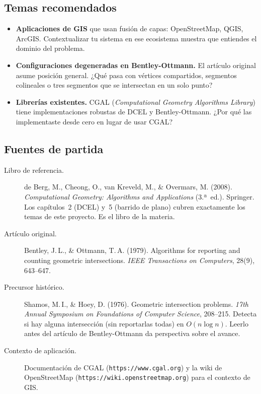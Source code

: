 \documentclass[12pt, oneside]{article}
\begin{document}
\subsection{Temas recomendados}

\begin{itemize}
  \item \textbf{Aplicaciones de GIS} que usan fusión de capas:
        OpenStreetMap, QGIS, ArcGIS.  Contextualizar tu sistema en
        ese ecosistema muestra que entiendes el dominio del problema.

  \item \textbf{Configuraciones degeneradas en Bentley-Ottmann.}
        El artículo original asume posición general.  ¿Qué pasa con
        vértices compartidos, segmentos colineales o tres segmentos
        que se intersectan en un solo punto?

  \item \textbf{Librerías existentes.}  CGAL (\textit{Computational
        Geometry Algorithms Library}) tiene implementaciones robustas
        de DCEL y Bentley-Ottmann.  ¿Por qué las implementaste desde
        cero en lugar de usar CGAL?
\end{itemize}

\subsection{Fuentes de partida}

\begin{description}
  \item[Libro de referencia.]
    de Berg, M., Cheong, O., van Kreveld, M., \& Overmars, M.
    (2008).  \textit{Computational Geometry: Algorithms and
    Applications} (3.ª~ed.).  Springer.
    Los capítulos~2 (DCEL) y~5 (barrido de plano) cubren exactamente
    los temas de este proyecto.  Es el libro de la materia.

  \item[Artículo original.]
    Bentley, J.\,L., \& Ottmann, T.\,A. (1979).
    Algorithms for reporting and counting geometric intersections.
    \textit{IEEE Transactions on Computers}, 28(9), 643--647.

  \item[Precursor histórico.]
    Shamos, M.\,I., \& Hoey, D. (1976).
    Geometric intersection problems.
    \textit{17th Annual Symposium on Foundations of Computer Science},
    208--215.
    Detecta si hay alguna intersección (sin reportarlas todas) en
    $O(n \log n)$.  Leerlo antes del artículo de Bentley-Ottmann
    da perspectiva sobre el avance.

  \item[Contexto de aplicación.]
    Documentación de CGAL (\texttt{https://www.cgal.org}) y la wiki de
    OpenStreetMap (\texttt{https://wiki.openstreetmap.org}) para el
    contexto de GIS.
\end{description}
\end{document}
